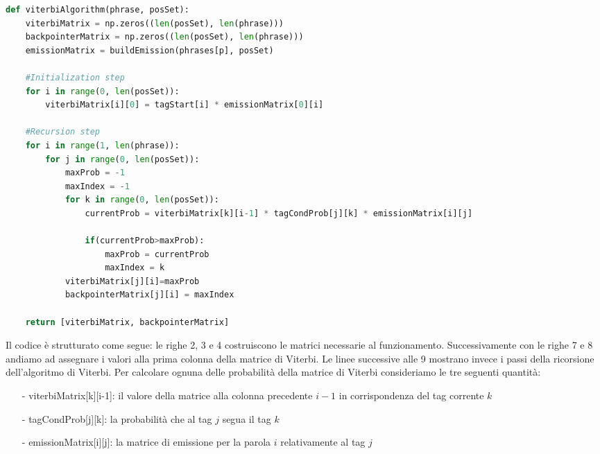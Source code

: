 \documentclass[10pt]{article}
\begin{document}
\begin{lstlisting}[language=Python]
def viterbiAlgorithm(phrase, posSet):
    viterbiMatrix = np.zeros((len(posSet), len(phrase)))
    backpointerMatrix = np.zeros((len(posSet), len(phrase)))
    emissionMatrix = buildEmission(phrases[p], posSet)
    
    #Initialization step
    for i in range(0, len(posSet)):
        viterbiMatrix[i][0] = tagStart[i] * emissionMatrix[0][i]
          
    #Recursion step
    for i in range(1, len(phrase)):
        for j in range(0, len(posSet)):
            maxProb = -1
            maxIndex = -1
            for k in range(0, len(posSet)):
                currentProb = viterbiMatrix[k][i-1] * tagCondProb[j][k] * emissionMatrix[i][j]
                
                if(currentProb>maxProb):
                    maxProb = currentProb
                    maxIndex = k
            viterbiMatrix[j][i]=maxProb
            backpointerMatrix[j][i] = maxIndex
          
    return [viterbiMatrix, backpointerMatrix]
\end{lstlisting}

Il codice è strutturato come segue: le righe 2, 3 e 4 costruiscono le matrici necessarie al funzionamento. Successivamente con le righe 7 e 8 andiamo ad assegnare i valori alla prima colonna della matrice di Viterbi. Le linee successive alle 9 mostrano invece i passi della ricorsione dell'algoritmo di Viterbi. Per calcolare ognuna delle probabilità della matrice di Viterbi consideriamo le tre seguenti quantità:
\begin{itemize}
	\item[-] viterbiMatrix[k][i-1]: il valore della matrice alla colonna precedente $i-1$ in corrispondenza del tag corrente $k$
	\item[-] tagCondProb[j][k]: la probabilità che al tag $j$ segua il tag $k$
	\item[-] emissionMatrix[i][j]: la matrice di emissione per la parola $i$ relativamente al tag $j$
\end{itemize}
\end{document}
